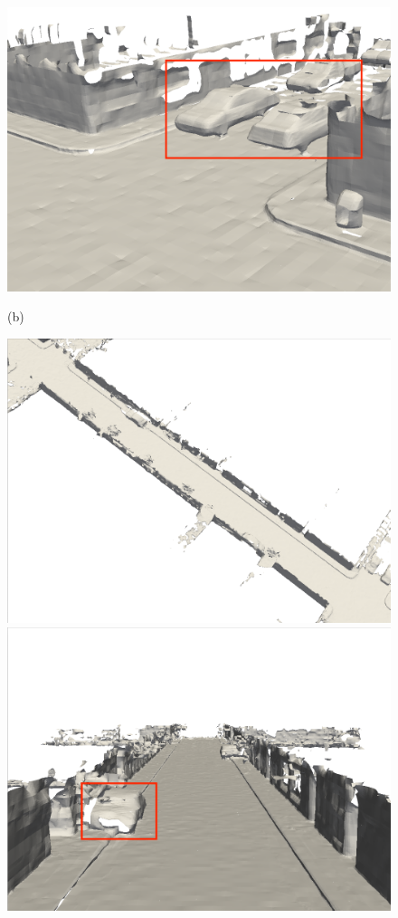 \begin{figure}[htbp]
\begin{minipage}{0.322\linewidth}
    \includegraphics[width=1\linewidth]{figures/mai_2_vox.png}
\end{minipage}\vfill
(b)
\begin{minipage}{0.322\linewidth}
    \centering
    \includegraphics[width=1\linewidth]{figures/mai_3_bce.png}
\end{minipage}\hfill
\begin{minipage}{0.322\linewidth}
    \centering
    \includegraphics[width=1\linewidth]{figures/mai_1_bce.png}

\end{minipage}
\end{figure}
